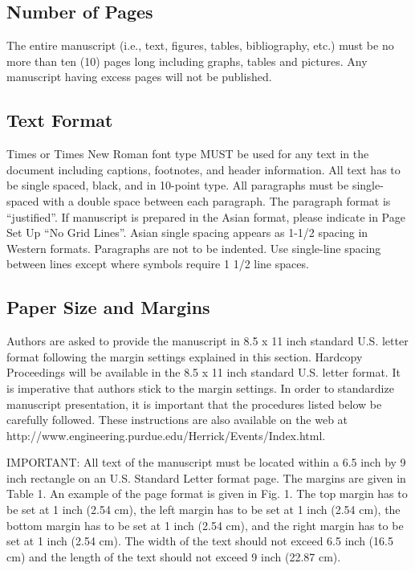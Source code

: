 \documentclass[10pt]{extarticle}
\begin{document}
\subsection{Number of Pages}
The entire manuscript (i.e., text, figures, tables, bibliography, etc.) must be no more than ten (10) pages long including graphs, tables and pictures.  Any manuscript having excess pages will not be published. 

\subsection{Text Format}
Times or Times New Roman font type MUST be used for any text in the document including captions, footnotes, and header information.  All text has to be single spaced, black, and in 10-point type. All paragraphs must be single-spaced with a double space between each paragraph. The paragraph format is “justified”.  If manuscript is prepared in the Asian format, please indicate in Page Set Up “No Grid Lines”.  Asian single spacing appears as 1-1/2 spacing in Western formats.  Paragraphs are not to be indented. Use single-line spacing between lines except where symbols require 1 1/2 line spaces.

\subsection{Paper Size and Margins}
Authors are asked to provide the manuscript in 8.5 x 11 inch standard U.S. letter format following the margin settings explained in this section.  Hardcopy Proceedings will be available in the 8.5 x 11 inch standard U.S. letter format.  It is imperative that authors stick to the margin settings.  In order to standardize manuscript presentation, it is important that the procedures listed below be carefully followed. These instructions are also available on the web at http://www.engineering.purdue.edu/Herrick/Events/Index.html.

IMPORTANT: All text of the manuscript must be located within a 6.5 inch by 9 inch rectangle on an U.S. Standard Letter format page.  The margins are given in Table 1.  An example of the page format is given in Fig. 1.  The top margin has to be set at 1 inch (2.54 cm), the left margin has to be set at 1 inch (2.54 cm), the bottom margin has to be set at 1 inch (2.54 cm), and the right margin has to be set at 1 inch (2.54 cm).  The width of the text should not exceed 6.5 inch (16.5 cm) and the length of the text should not exceed 9 inch (22.87 cm).
\end{document}
